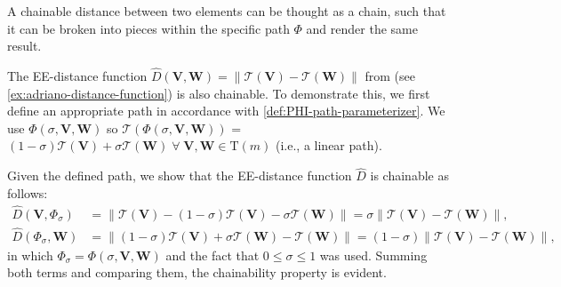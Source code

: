 A chainable distance between two elements can be thought as a chain, such that it can be broken into pieces within the specific path $\Phi$ and render the same result.
\begin{example} \label{ex:chainability}
    The EE-distance function $\widehat{D}(\mathbf{V}, \mathbf{W})=\|\mathcal{T}(\mathbf{V}) - \mathcal{T}(\mathbf{W})\|$ from \citet{Rezende2022} (see \cref{ex:adriano-distance-function}) is also chainable. To demonstrate this, we first define an appropriate path in accordance with \cref{def:PHI-path-parameterizer}. We use $\Phi(\sigma, \mathbf{V}, \mathbf{W})$ so $\mathcal{T}(\Phi(\sigma, \mathbf{V}, \mathbf{W}))$ = $(1 - \sigma)\mathcal{T}(\mathbf{V}) + \sigma \mathcal{T}(\mathbf{W})\;\forall\;\mathbf{V},\mathbf{W}\in \text{T}(m)$ (i.e., a linear path).

    Given the defined path, we show that the EE-distance function $\widehat{D}$ is chainable as follows:
    \begin{align}
            \widehat{D}(\mathbf{V}, \Phi_\sigma) &= \|\mathcal{T}(\mathbf{V}) - (1 - \sigma)\mathcal{T}(\mathbf{V}) - \sigma \mathcal{T}(\mathbf{W})\|
            =\sigma\|\mathcal{T}(\mathbf{V})-\mathcal{T}(\mathbf{W})\|,  \label{eq:example-adriano-chainable-DvPhi}
        \\
            \widehat{D}(\Phi_\sigma, \mathbf{W}) &= \|(1 - \sigma)\mathcal{T}(\mathbf{V}) + \sigma \mathcal{T}(\mathbf{W}) - \mathcal{T}(\mathbf{W})\|
            =(1-\sigma)\|\mathcal{T}(\mathbf{V})-\mathcal{T}(\mathbf{W})\|,
    \end{align}
    in which $\Phi_{\sigma} = \Phi(\sigma,\mathbf{V},\mathbf{W})$ and the fact that $0\le \sigma \le 1$ was used. Summing both terms and comparing them, the chainability property is evident. 
\end{example}

